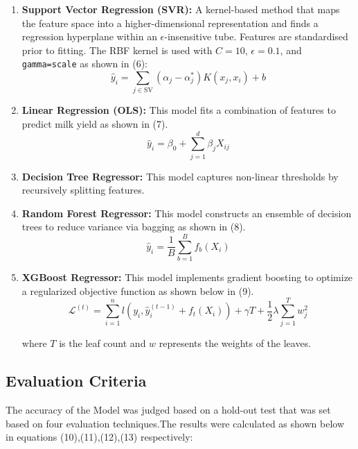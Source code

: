 \documentclass[conference]{IEEEtran}
\begin{document}
	\begin{enumerate}
		\item \textbf{Support Vector Regression (SVR):} A kernel-based method that maps the feature space into a higher-dimensional representation and finds a regression hyperplane within an $\epsilon$-insensitive tube. Features are standardised prior to fitting. The RBF kernel is used with $C = 10$, $\epsilon = 0.1$, and \texttt{gamma=scale} as shown in (6):
		\begin{equation}
			\hat{y}_i = \sum_{j \in \text{SV}} (\alpha_j - \alpha_j^*) K(x_j, x_i) + b
			\tag{6}
		\end{equation}
		
		\item \textbf{Linear Regression (OLS):} This model fits a combination of features to predict milk yield as shown in (7).
		\begin{equation}
			\hat{y}_i = \beta_0 + \sum_{j=1}^{d} \beta_j X_{ij}
			\tag{7}
		\end{equation}
		
		\item \textbf{Decision Tree Regressor:} This model captures non-linear thresholds by recursively splitting features.
		
		\item \textbf{Random Forest Regressor:} This model constructs an ensemble of decision trees to reduce variance via bagging \cite{ref4} as shown in (8).
		\begin{equation}
			\hat{y}_i = \frac{1}{B} \sum_{b=1}^{B} f_b(X_i)
			\tag{8}	
		\end{equation}
		
		
		\item \textbf{XGBoost Regressor:} This model implements gradient boosting to optimize a regularized objective function as shown below in (9).
		\begin{equation}
			\mathcal{L}^{(t)} = \sum_{i=1}^{n} l(y_i, \hat{y}_i^{(t-1)} + f_t(X_i)) + \gamma T + \frac{1}{2} \lambda \sum_{j=1}^{T} w_j^2
			\tag{9}
		\end{equation}
		
		
		where $T$ is the leaf count and $w$ represents the weights of the leaves.
	\end{enumerate}
	
	\subsection{Evaluation Criteria}
	The accuracy of the Model was judged based on a hold-out test that was set based on four evaluation techniques.The results were calculated as shown below in equations (10),(11),(12),(13) respectively: 
	
\end{document}
